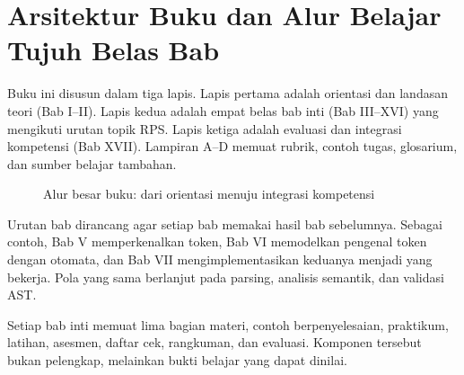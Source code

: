 \section{Arsitektur Buku dan Alur Belajar Tujuh Belas Bab}
\label{sec:ch01-arsitektur}

Buku ini disusun dalam tiga lapis. Lapis pertama adalah orientasi dan
landasan teori (Bab I--II). Lapis kedua adalah empat belas bab inti
(Bab III--XVI) yang mengikuti urutan topik RPS. Lapis ketiga adalah
evaluasi dan integrasi kompetensi (Bab XVII). Lampiran A--D memuat
rubrik, contoh tugas, glosarium, dan sumber belajar tambahan.

\begin{figure}[H]
\centering
{}
\caption{Alur besar buku: dari orientasi menuju integrasi kompetensi}
\label{fig:ch01-alur-buku}
\end{figure}

Urutan bab dirancang agar setiap bab memakai hasil bab sebelumnya.
Sebagai contoh, Bab V memperkenalkan token, Bab VI memodelkan pengenal
token dengan otomata, dan Bab VII mengimplementasikan keduanya menjadi
 yang bekerja. Pola yang sama berlanjut pada parsing,
analisis semantik, dan validasi AST.

Setiap bab inti memuat lima bagian materi, contoh berpenyelesaian,
praktikum, latihan, asesmen, daftar cek, rangkuman, dan evaluasi.
Komponen tersebut bukan pelengkap, melainkan bukti belajar yang dapat
dinilai.
